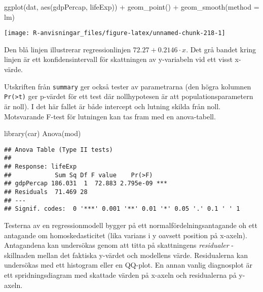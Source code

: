 \documentclass[
]{book}
\newenvironment{Shaded}{\begin{snugshade}}{\end{snugshade}}
\newcommand{\AttributeTok}[1]{\textcolor[rgb]{0.77,0.63,0.00}{#1}}
\newcommand{\FunctionTok}[1]{\textcolor[rgb]{0.00,0.00,0.00}{#1}}
\newcommand{\NormalTok}[1]{#1}
\newcommand{\SpecialCharTok}[1]{\textcolor[rgb]{0.00,0.00,0.00}{#1}}
\theoremstyle{definition}
\theoremstyle{definition}
\theoremstyle{definition}
\theoremstyle{definition}
\theoremstyle{remark}
\begin{document}
\begin{Shaded}
\begin{Highlighting}[]
\FunctionTok{ggplot}\NormalTok{(dat, }\FunctionTok{aes}\NormalTok{(gdpPercap, lifeExp)) }\SpecialCharTok{+}
  \FunctionTok{geom\_point}\NormalTok{() }\SpecialCharTok{+}
  \FunctionTok{geom\_smooth}\NormalTok{(}\AttributeTok{method =}\NormalTok{ lm)}
\end{Highlighting}
\end{Shaded}

\begin{center}\texttt{[image: R-anvisningar\_files/figure-latex/unnamed-chunk-218-1]} \end{center}

Den blå linjen illustrerar regressionlinjen \(72.27 + 0.2146 \cdot x\). Det grå bandet kring linjen är ett konfidensintervall för skattningen av y-variabeln vid ett visst x-värde.

Utskriften från \texttt{summary} ger också tester av parametrarna (den högra kolumnen \texttt{Pr(\textgreater{}\textbar{}t\textbar{})} ger p-värdet för ett test där nollhypotesen är att populationsparametern är noll). I det här fallet är både intercept och lutning skilda från noll. Motsvarande F-test för lutningen kan tas fram med en anova-tabell.

\begin{Shaded}
\begin{Highlighting}[]
\FunctionTok{library}\NormalTok{(car)}
\FunctionTok{Anova}\NormalTok{(mod)}
\end{Highlighting}
\end{Shaded}

\begin{verbatim}
## Anova Table (Type II tests)
## 
## Response: lifeExp
##            Sum Sq Df F value    Pr(>F)    
## gdpPercap 186.031  1  72.883 2.795e-09 ***
## Residuals  71.469 28                      
## ---
## Signif. codes:  0 '***' 0.001 '**' 0.01 '*' 0.05 '.' 0.1 ' ' 1
\end{verbatim}

Testerna av en regressionmodell bygger på ett normalfördelningsantagande oh ett antagande om homoskedasticitet (lika varians i y oavsett position på x-axeln). Antagandena kan undersökas genom att titta på skattningens \emph{residualer} - skillnaden mellan det faktiska y-värdet och modellens värde. Residualerna kan undersökas med ett histogram eller en QQ-plot. En annan vanlig diagnosplot är ett spridningsdiagram med skattade värden på x-axeln och residualerna på y-axeln.
\end{document}
